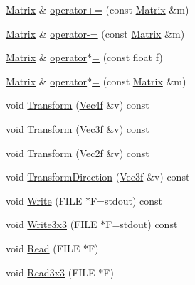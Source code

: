 \begin{DoxyCompactItemize}
\item 
\hyperlink{classMatrix}{Matrix} \& \hyperlink{classMatrix_a2780b459599c6ba0b4c63ce6ca6c1ba9}{operator+=} (const \hyperlink{classMatrix}{Matrix} \&m)
\item 
\hyperlink{classMatrix}{Matrix} \& \hyperlink{classMatrix_a26bb57b9a95c3c5ddcb6dfe4de089f04}{operator-\/=} (const \hyperlink{classMatrix}{Matrix} \&m)
\item 
\hyperlink{classMatrix}{Matrix} \& \hyperlink{classMatrix_a2db81df6efad774392a12384f7c2cf26}{operator$\ast$=} (const float f)
\item 
\hyperlink{classMatrix}{Matrix} \& \hyperlink{classMatrix_a4680eaaf820efafb0017a2ee593bea8c}{operator$\ast$=} (const \hyperlink{classMatrix}{Matrix} \&m)
\item 
void \hyperlink{classMatrix_a815a83fda075f44bf71f13defca9f83e}{Transform} (\hyperlink{classVec4f}{Vec4f} \&v) const 
\item 
void \hyperlink{classMatrix_a7208989bf27372bb361390c4b4df2157}{Transform} (\hyperlink{classVec3f}{Vec3f} \&v) const 
\item 
void \hyperlink{classMatrix_a16f9a1cf796c64979de415ba161ef84c}{Transform} (\hyperlink{classVec2f}{Vec2f} \&v) const 
\item 
void \hyperlink{classMatrix_a21f46ddfd67d21e873076e468f9b793e}{Transform\+Direction} (\hyperlink{classVec3f}{Vec3f} \&v) const 
\item 
void \hyperlink{classMatrix_ae8ba2f4d4b1431f5a0a9b77e654a544f}{Write} (F\+I\+L\+E $\ast$F=stdout) const 
\item 
void \hyperlink{classMatrix_a2c6c2fd2c666999a410ebccbd510d4fe}{Write3x3} (F\+I\+L\+E $\ast$F=stdout) const 
\item 
void \hyperlink{classMatrix_a6b4caf9e67b3981b432a7d7ea33530fa}{Read} (F\+I\+L\+E $\ast$F)
\item 
void \hyperlink{classMatrix_aa9884c4699079277f126cbaef4b76df6}{Read3x3} (F\+I\+L\+E $\ast$F)
\end{DoxyCompactItemize}
